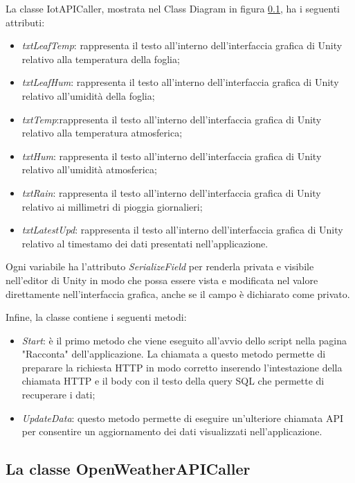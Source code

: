 La classe IotAPICaller, mostrata nel Class Diagram in figura \ref{}, ha i seguenti attributi:

\begin{itemize}
    \item \textit{txtLeafTemp}: rappresenta il testo all'interno dell'interfaccia grafica di Unity relativo alla temperatura della foglia; 
    \item \textit{txtLeafHum}: rappresenta il testo all'interno dell'interfaccia grafica di Unity relativo all'umidità della foglia;
    \item \textit{txtTemp}:rappresenta il testo all'interno dell'interfaccia grafica di Unity relativo alla temperatura atmosferica;
    \item \textit{txtHum}: rappresenta il testo all'interno dell'interfaccia grafica di Unity relativo all'umidità atmosferica;
    \item \textit{txtRain}: rappresenta il testo all'interno dell'interfaccia grafica di Unity relativo ai millimetri di pioggia giornalieri;
    \item \textit{txtLatestUpd}: rappresenta il testo all'interno dell'interfaccia grafica di Unity relativo al timestamo dei dati presentati nell'applicazione.
\end{itemize}

Ogni variabile ha l'attributo \textit{SerializeField} per renderla privata e visibile nell'editor di Unity in modo che possa essere vista e modificata nel valore direttamente nell'interfaccia grafica, anche se il campo è dichiarato come privato.

Infine, la classe contiene i seguenti metodi:

\begin{itemize}
    \item \textit{Start}: è il primo metodo che viene eseguito all'avvio dello script nella pagina "Racconta" dell'applicazione. La chiamata a questo metodo permette di preparare la richiesta HTTP in modo corretto inserendo l'intestazione della chiamata HTTP e il body con il testo della query SQL che permette di recuperare i dati;
    \item \textit{UpdateData}: questo metodo permette di eseguire un'ulteriore chiamata API per consentire un aggiornamento dei dati visualizzati nell'applicazione.
\end{itemize}

\subsection{La classe OpenWeatherAPICaller}

